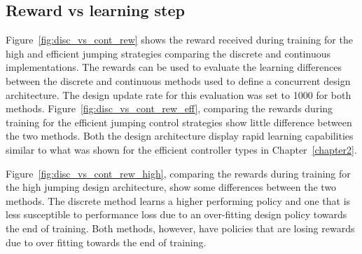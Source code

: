 \subsection{Reward vs learning step}

Figure~\ref{fig:disc_vs_cont_rew} shows the reward received during training for the high and efficient jumping strategies comparing the discrete and continuous implementations. The rewards can be used to evaluate the learning differences between the discrete and continuous methods used to define a concurrent design architecture. The design update rate for this evaluation was set to 1000 for both methods. Figure~\ref{fig:disc_vs_cont_rew_eff}, comparing the rewards during training for the efficient jumping control strategies show little difference between the two methods. Both the design architecture display rapid learning capabilities similar to what was shown for the efficient controller types in Chapter~\ref{chapter2}.

Figure~\ref{fig:disc_vs_cont_rew_high}, comparing the rewards during training for the high jumping design architecture, show some differences between the two methods. The discrete method learns a higher performing policy and one that is less susceptible to performance loss due to an over-fitting design policy towards the end of training. Both methods, however, have policies that are losing rewards due to over fitting towards the end of training.

